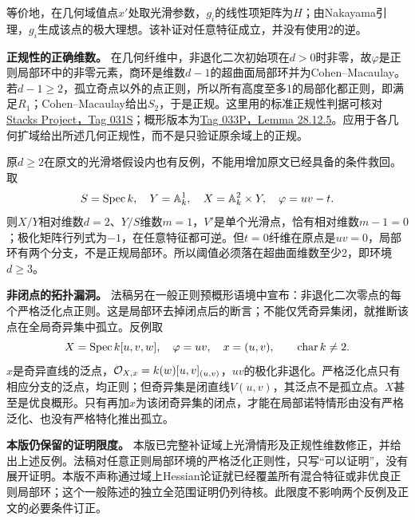 等价地，在几何域值点$x'$处取光滑参数，$g_i$的线性项矩阵为$H$；由Nakayama引理，$g_i$生成该点的极大理想。该补证对任意特征成立，并没有使用$2$的逆。

\noindent\textbf{正规性的正确维数。}
在几何纤维中，非退化二次初始项在$d>0$时非零，故$\varphi$是正则局部环中的非零元素，商环是维数$d-1$的超曲面局部环并为Cohen--Macaulay。若$d-1\ge2$，孤立奇点以外的点正则，所以所有高度至多1的局部化都正则，即满足$R_1$；Cohen--Macaulay给出$S_2$，于是正规。这里用的标准正规性判据可核对\href{https://stacks.math.columbia.edu/tag/031S}{Stacks Project，Tag 031S}；概形版本为\href{https://stacks.math.columbia.edu/tag/033P}{Tag 033P，Lemma 28.12.5}。应用于各几何扩域给出所述几何正规性，而不是只验证原余域上的正规。

原$d\ge2$在原文的光滑塔假设内也有反例，不能用增加原文已经具备的条件救回。取
\[
 S=\operatorname{Spec} k,\quad Y=\mathbb A^1_k,
 \quad X=\mathbb A^2_k\times Y,\quad\varphi=uv-t.
\]
则$X/Y$相对维数$d=2$、$Y/S$维数$m=1$，$V'$是单个光滑点，恰有相对维数$m-1=0$；极化矩阵行列式为$-1$，在任意特征都可逆。但$t=0$纤维在原点是$uv=0$，局部环有两个分支，不是正规局部环。所以阈值必须落在超曲面维数至少2，即环境$d\ge3$。

\noindent\textbf{非闭点的拓扑漏洞。}
法稿另在一般正则预概形语境中宣布：非退化二次零点的每个严格泛化点正则。这是局部环去掉闭点后的断言；不能仅凭奇异集闭，就推断该点在全局奇异集中孤立。反例取
\[
 X=\operatorname{Spec} k[u,v,w],\quad\varphi=uv,\quad
 x=(u,v),\qquad\operatorname{char}k\ne2.
\]
$x$是奇异直线的泛点，$\mathcal O_{X,x}=k(w)[u,v]_{(u,v)}$，$uv$的极化非退化。严格泛化点只有相应分支的泛点，均正则；但奇异集是闭直线$V(u,v)$，其泛点不是孤立点。$X$甚至是优良概形。只有再加$x$为该闭奇异集的闭点，才能在局部诺特情形由没有严格泛化、也没有严格特化推出孤立。

\noindent\textbf{本版仍保留的证明限度。}
本版已完整补证域上光滑情形及正规性维数修正，并给出上述反例。法稿对任意正则局部环境的严格泛化正则性，只写“可以证明”，没有展开证明。本版不声称通过域上Hessian论证就已经覆盖所有混合特征或非优良正则局部环；这个一般陈述的独立全范围证明仍列待核。此限度不影响两个反例及正文的必要条件订正。

